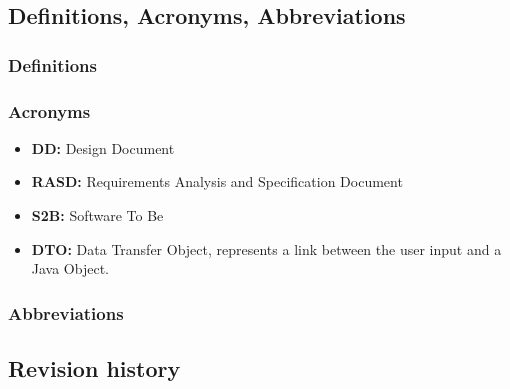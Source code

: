 \documentclass[table, 12pt]{article}
\begin{document}
\subsection{Definitions, Acronyms, Abbreviations}
\subsubsection{Definitions}
\subsubsection{Acronyms}
\begin{itemize}
    \item \textbf{DD:} Design Document
    \item \textbf{RASD:} Requirements Analysis and Specification Document
    \item \textbf{S2B:} Software To Be
    \item \textbf{DTO:} Data Transfer Object, represents a link between the user input and a Java Object.
\end{itemize}
\subsubsection{Abbreviations}
\subsection{Revision history}
\end{document}
